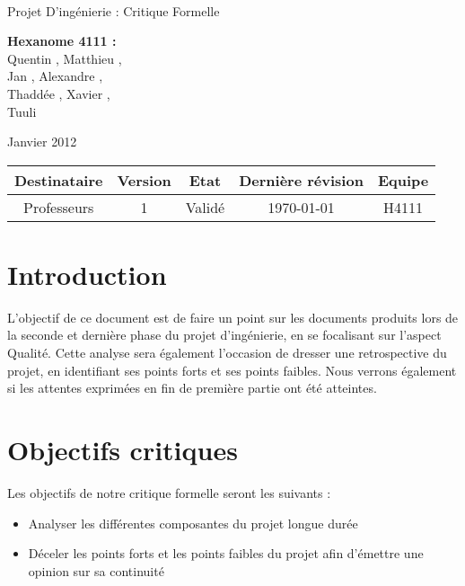 \documentclass[a4paper]{article}
\begin{document}
\begin{titlepage}
~ 
\vfill
	\begin{center}
		\begin{Huge}
		Projet D'ingénierie : Critique Formelle\\
		\end{Huge} 
\vfill
		\textbf{Hexanome 4111 :} 
		\\Quentin {}, Matthieu , 
		\\Jan {}, Alexandre , 
		\\Thaddée , Xavier ,
		\\Tuuli {}
\vfill		
		\begin{Large}
		Janvier 2012
		\end{Large}
\vfill
	\begin{tabular}{|c|c|c|c|c|}
 	 \hline
   Destinataire & Version & Etat & Dernière révision & Equipe \\
   \hline
   Professeurs & 1 & Validé & \today & H4111 \\
   \hline
	\end{tabular}
	\end{center}
\vfill
\end{titlepage}
\newpage
\tableofcontents
\newpage

\section{Introduction}

L'objectif de ce document est de faire un point sur les documents produits lors de la seconde et dernière phase du projet d'ingénierie, en se focalisant sur l'aspect Qualité. Cette analyse sera également l'occasion de dresser une retrospective du projet, en identifiant ses points forts et ses points faibles. Nous verrons également si les attentes exprimées en fin de première partie ont été atteintes.

\section{Objectifs critiques}

Les objectifs de notre critique formelle seront les suivants :

\begin{itemize}
\item Analyser les différentes composantes du projet longue durée
\item Déceler les points forts et les points faibles du projet afin d'émettre une opinion sur sa continuité
\end{itemize}
\end{document}
